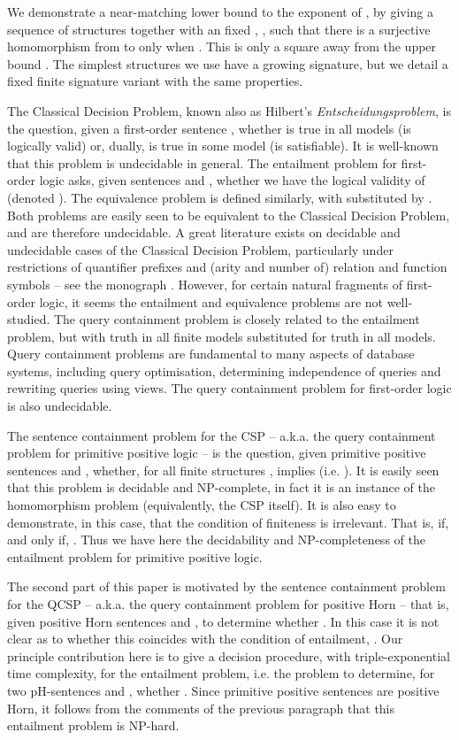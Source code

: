 \documentclass{LMCS}
\begin{document}
We demonstrate a near-matching lower bound to the exponent of , by giving a sequence of structures  together with an fixed , , such that there is a surjective homomorphism from  to  only when . This is only a square away from the upper bound  . The simplest structures we use have a growing signature, but we detail a fixed finite signature variant with the same properties.

The Classical Decision Problem, known also as Hilbert's \emph{Entscheidungsproblem}, is the question, given a first-order sentence , whether  is true in all models (is logically valid) or, dually, is true in some model (is satisfiable). It is well-known that this problem is undecidable in general. The entailment problem for first-order logic asks, given sentences  and , whether we have the logical validity of  (denoted ). The equivalence problem is defined similarly, with  substituted by . Both problems are easily seen to be equivalent to the Classical Decision Problem, and are therefore undecidable. A great literature exists on decidable and undecidable cases of the Classical Decision Problem, particularly under restrictions of quantifier prefixes and (arity and number of) relation and function symbols -- see the monograph \cite{CDP}. However, for certain natural fragments of first-order logic, it seems the entailment and equivalence problems are not well-studied. The query containment problem is closely related to the entailment problem, but with truth in all finite models substituted for truth in all models. Query containment problems are fundamental to many aspects of database systems, including query optimisation, determining independence of queries and rewriting queries using views. The query containment problem for first-order logic is also undecidable.

The sentence containment problem for the CSP -- \mbox{a.k.a.} the query containment problem for primitive positive logic -- is the question, given primitive positive sentences  and , whether, for all finite structures ,  implies  (\mbox{i.e.} ). It is easily seen that this problem is decidable and NP-complete, in fact it is an instance of the homomorphism problem (equivalently, the CSP itself). It is also easy to demonstrate, in this case, that the condition of finiteness is irrelevant. That is,  if, and only if, . Thus we have here the decidability and NP-completeness of the entailment problem for primitive positive logic.

The second part of this paper is motivated by the sentence containment problem for the QCSP -- \mbox{a.k.a.} the query containment problem for positive Horn -- that is, given positive Horn sentences  and , to determine whether . In this case it is not clear as to whether this coincides with the condition of entailment, .
Our principle contribution here is to give a decision procedure, with triple-exponential time complexity, for the entailment problem, \mbox{i.e.} the problem to determine, for two pH-sentences  and , whether . Since primitive positive sentences are positive Horn, it follows from the comments of the previous paragraph that this entailment problem is NP-hard.
\end{document}
